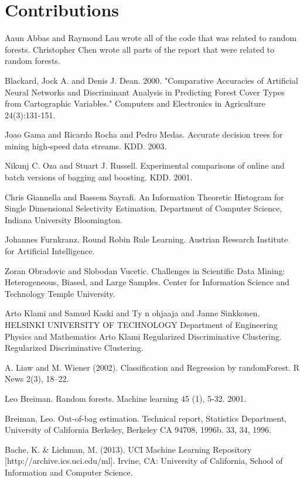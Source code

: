 \documentclass[11pt]{article}
\begin{document}
\section{Contributions}
Aaun Abbas and Raymond Lau wrote all of the code that was related to random forests. Christopher Chen wrote all parts of the report that were related to random forests.

\pagebreak
\begin{thebibliography}{}
Blackard, Jock A. and Denis J. Dean. 2000. "Comparative Accuracies of Artificial Neural Networks and Discriminant Analysis in Predicting Forest Cover Types from Cartographic Variables." Computers and Electronics in Agriculture 24(3):131-151.

Joao Gama and Ricardo Rocha and Pedro Medas. Accurate decision trees for mining high-speed data streams. KDD. 2003.

Nikunj C. Oza and Stuart J. Russell. Experimental comparisons of online and batch versions of bagging and boosting. KDD. 2001.

Chris Giannella and Bassem Sayrafi. An Information Theoretic Histogram for Single Dimensional Selectivity Estimation. Department of Computer Science, Indiana University Bloomington.

Johannes Furnkranz. Round Robin Rule Learning. Austrian Research Institute for Artificial Intelligence.

Zoran Obradovic and Slobodan Vucetic. Challenges in Scientific Data Mining: Heterogeneous, Biased, and Large Samples. Center for Information Science and Technology Temple University.

Arto Klami and Samuel Kaski and Ty n ohjaaja and Janne Sinkkonen. HELSINKI UNIVERSITY OF TECHNOLOGY Department of Engineering Physics and Mathematics Arto Klami Regularized Discriminative Clustering. Regularized Discriminative Clustering.

A. Liaw and M. Wiener (2002). Classification and Regression by randomForest. R News 2(3), 18--22.

Leo Breiman. Random forests. Machine learning 45 (1), 5-32. 2001.

Breiman, Leo. Out-of-bag estimation. Technical report, Statistics Department, University of California Berkeley, Berkeley CA 94708, 1996b. 33, 34, 1996.

Bache, K. \& Lichman, M. (2013). UCI Machine Learning Repository [http://archive.ics.uci.edu/ml]. Irvine, CA: University of California, School of Information and Computer Science.


\end{thebibliography}
\end{document}
